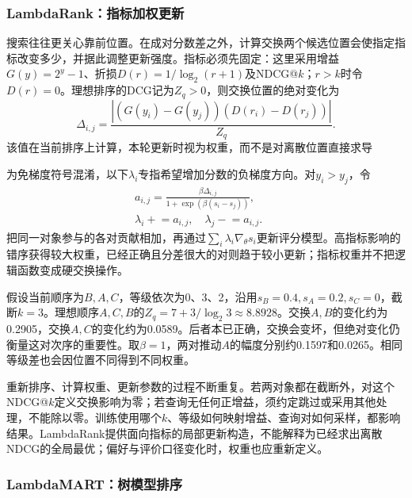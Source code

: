 \Needspace{100mm}
\subsubsection{LambdaRank：指标加权更新}
\label{sec:rs-search-lambdarank}

搜索往往更关心靠前位置。在成对分数差之外，计算交换两个候选位置会使指定指标改变多少，并据此调整更新强度。指标必须先固定：这里采用增益$G(y)=2^y-1$、折损$D(r)=1/\log_2(r+1)$及NDCG@$k$；$r>k$时令$D(r)=0$。理想排序的DCG记为$Z_q>0$，则交换位置的绝对变化为
\begin{equation}
 \Delta_{i,j}=\frac{|(G(y_i)-G(y_j))(D(r_i)-D(r_j))|}{Z_q}.
 \label{eq:rs-search-lambdarank-weight}
\end{equation}
该值在当前排序上计算，本轮更新时视为权重，而不是对离散位置直接求导

为免梯度符号混淆，以下$\lambda_i$专指希望增加分数的负梯度方向。对$y_i>y_j$，令
\begin{equation}
 \begin{split}
 a_{i,j}=\frac{\beta\Delta_{i,j}}{1+\exp(\beta(s_i-s_j))},
 \qquad\\
 \lambda_i\mathrel{+}=a_{i,j},\quad
 \lambda_j\mathrel{-}=a_{i,j}.
 \end{split}
 \label{eq:rs-search-lambdarank-update}
\end{equation}
把同一对象参与的各对贡献相加，再通过$\sum_i\lambda_i\nabla_\theta s_i$更新评分模型。高指标影响的错序获得较大权重，已经正确且分差很大的对则趋于较小更新；指标权重并不把逻辑函数变成硬交换操作。

假设当前顺序为$B,A,C$，等级依次为0、3、2，沿用$s_B=0.4,s_A=0.2,s_C=0$，截断$k=3$。理想顺序$A,C,B$的$Z_q=7+3/\log_2 3\approx8.8928$。交换$A,B$的变化约为0.2905，交换$A,C$的变化约为0.0589。后者本已正确，交换会变坏，但绝对变化仍衡量这对次序的重要性。取$\beta=1$，两对推动$A$的幅度分别约0.1597和0.0265。相同等级差也会因位置不同得到不同权重。

重新排序、计算权重、更新参数的过程不断重复。若两对象都在截断外，对这个NDCG@$k$定义交换影响为零；若查询无任何正增益，须约定跳过或采用其他处理，不能除以零。训练使用哪个$k$、等级如何映射增益、查询对如何采样，都影响结果。LambdaRank提供面向指标的局部更新构造，不能解释为已经求出离散NDCG的全局最优；偏好与评价口径变化时，权重也应重新定义。

\Needspace{100mm}
\subsubsection{LambdaMART：树模型排序}
\label{sec:rs-search-lambdamart}

